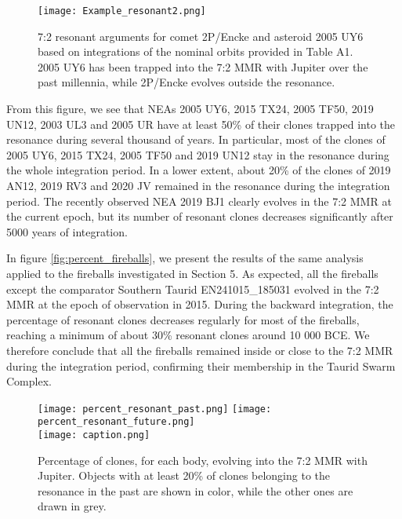\documentclass[a4paper,11pt]{article}
\begin{document}
\begin{figure}[!ht]
	\centering
	\texttt{[image: Example\_resonant2.png]}
	\caption{7:2 resonant arguments for comet 2P/Encke and asteroid 2005 UY6 based on integrations of the nominal orbits provided in Table A1. 2005 UY6 has been trapped into the 7:2 MMR with Jupiter over the past millennia, while 2P/Encke evolves outside the resonance. }
	\label{fig:example_resonant}
\end{figure}

From this figure, we see that NEAs 2005 UY6, 2015 TX24, 2005 TF50, 2019 UN12, 2003 UL3 and 2005 UR have at least 50\% of their clones trapped into the resonance during several thousand of years. In particular, most of the clones of 2005 UY6, 2015 TX24, 2005 TF50 and 2019 UN12 stay in the resonance during the whole integration period. In a lower extent, about 20\% of the clones of 2019 AN12, 2019 RV3 and 2020 JV remained in the resonance during the integration period. The recently observed NEA 2019 BJ1 clearly evolves in the 7:2 MMR at the current epoch, but its number of resonant clones decreases significantly after 5000 years of integration. 

In figure \ref{fig:percent_fireballs}, we present the results of the same analysis applied to the fireballs investigated in Section 5. As expected, all the fireballs except the comparator Southern Taurid EN241015\_185031 evolved in the 7:2 MMR at the epoch of observation in 2015. During the backward integration, the percentage of resonant clones decreases regularly for most of the fireballs, reaching a minimum of about 30\% resonant clones around 10 000 BCE. We therefore conclude that all the fireballs remained inside or close to the 7:2 MMR during the integration period, confirming their membership in the Taurid Swarm Complex. 

\begin{figure}[!ht]
	\centering
	\texttt{[image: percent\_resonant\_past.png]}
	\texttt{[image: percent\_resonant\_future.png]}\\[0.2cm]
	\texttt{[image: caption.png]}
	\caption{Percentage of clones, for each body, evolving into the 7:2 MMR with Jupiter. Objects with at least 20\% of clones belonging to the resonance in the past are shown in color, while the other ones are drawn in grey.}
	\label{fig:percent_resonant}
\end{figure}
\end{document}

